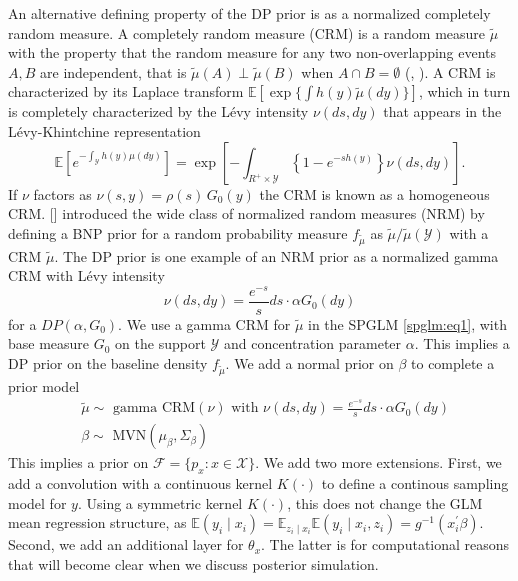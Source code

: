 \documentclass{article}[12pt]
\newcommand{\YY}{\mathcal{Y}}
\newcommand{\citeaa}[1]{\citeauthor{#1}, \href{cite.#1}{\textcolor{blue}{\citeyear{#1}}}}     %
\newcommand{\citeab}[1]{\citeauthor{#1} [\href{cite.#1}{\textcolor{blue}{\citeyear{#1}}}]}  %
\renewcommand{\th}{\theta}
\newcommand{\tmu}{\widetilde{\mu}}
\newcommand{\scf}{\mathcal{F}}
\newcommand{\sx}{\mathcal{X}}
\newcommand{\sy}{\mathcal{Y}}
\newcommand{\E}{\mathbb{E}}
\renewcommand{\scf}{\mathcal{F}}
\renewcommand{\sx}{\mathcal{X}}
\renewcommand{\sy}{\mathcal{Y}}
\begin{document}
An alternative  defining property of the DP prior is as a normalized completely random measure. A completely random measure (CRM) is a random measure $\tmu$ with the property that the random measure for any two non-overlapping events $A,B$ are independent, that is $\tmu(A) \perp \tmu(B)$ when $A \cap B = \emptyset$ (\citeaa{kingman1967completely}).
A CRM is characterized by its Laplace transform $\E[\exp\{ \int h(y) \tmu(dy) \}]$, which in turn is completely characterized by the L\'evy intensity $\nu(ds, dy)$ that appears in the L\'evy-Khintchine representation
\begin{equation}
\E\left[e^{-\int_\sy h(y) \mu(dy)}\right] = \exp \left[- \int_{R^+
    \times \sy} \left\{1 - e^{-sh(y)}\right\}\nu(ds, dy) \right].
\label{eq:LK}
\end{equation}
If $\nu$ factors as $\nu(s,y)= \rho(s)\, G_0(y)$ the CRM is known as
a homogeneous CRM. \citeab{regazzini2003distributional} introduced the wide class of normalized random measures (NRM) by defining a BNP prior for a random probability measure $f_{\tmu}$ as $\tmu/\tmu(\sy)$ with 
a CRM $\tmu$.
The DP prior is one example of an NRM prior as a normalized gamma CRM
with L\'evy intensity
\begin{equation}
\nu(ds, dy)= \frac{e^{-s}}{s} ds \cdot \alpha G_0(dy)
\label{eq:ga}
\end{equation}
for a $DP(\alpha,G_0)$. We use a gamma CRM for $\tmu$ in the SPGLM \eqref{spglm:eq1}, with base measure $G_0$ on the
support $\YY$ and concentration parameter $\alpha$. This
implies a DP prior on the baseline density $f_{\tmu}$. We add a normal prior on $\beta$ to complete a prior model 
\begin{align} 
\label{priors}
  &\tmu \sim \text{ gamma CRM}(\nu)
    \mbox{ with }
    \nu(ds, dy) = \frac{e^{-s}}{s} ds \cdot \alpha G_0(dy) \nonumber \\ 
    & \beta \sim \text{ MVN}(\mu_\beta, \Sigma_\beta) 
\end{align}
This implies a prior on $\scf = \{p_x: x \in \sx\}$. We add two more
extensions.
First, we add a convolution with a continuous kernel $K(\cdot)$ to
define a continous sampling model for $y$.  Using a symmetric
kernel $K(\cdot)$, this
does not change the GLM mean regression structure, as $\E(y_i \mid
x_i) = \E_{z_i \mid x_i}  \E(y_i \mid x_i, z_i) = g^{-1}(x^\prime_i
\beta)$. 
Second, we add an additional layer for $\th_x$. The latter is for
computational reasons that will become clear when we discuss posterior
simulation.
\end{document}
